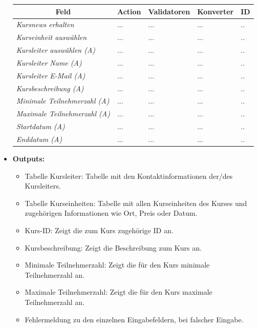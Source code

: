 \begin{itemize}
\begin{center}
\begin{longtable}{|p{3cm} |p{4cm} | p{4cm}|p{3cm} |p{2cm}|}
						\hline \multicolumn{1}{|c|}{\textbf{Feld}} & \multicolumn{1}{|c|}{\textbf{Action}} & \multicolumn{1}{|c|}{\textbf{Validatoren}}  &  \multicolumn{1}{|c|}{\textbf{Konverter}} &  \multicolumn{1}{|c|}{\textbf{ID}} \\ \hline
						\endfirsthead
						\hline
						\endlastfoot
						\textit{Kursnews erhalten} & ... & ... & ... & ..\\ \hline
						\textit{Kurseinheit auswählen} & ... & ... & ... & ..\\ \hline
						\textit{Kursleiter auswählen (A)} & ... & ... & ... & ..\\ \hline
						\textit{Kursleiter Name (A)} & ... & ... & ... & ..\\ \hline
						\textit{Kursleiter E-Mail (A)} & ... & ... & ... & ..\\ \hline
						\textit{Kursbeschreibung (A)} & ... & ... & ... & ..\\ \hline
						\textit{Minimale Teilnehmerzahl (A)} & ... & ... & ... & ..\\ \hline
						\textit{Maximale Teilnehmerzahl (A)} & ... & ... & ... & ..\\ \hline
						\textit{Startdatum (A)} & ... & ... & ... & ..\\ \hline
						\textit{Enddatum (A)} & ... & ... & ... & ..\\ \hline
					\end{longtable}
				\end{center}
			\item \textbf{Outputs:}
			\begin{itemize}
				\item Tabelle Kursleiter: Tabelle mit den Kontaktinformationen der/des Kursleiters.
				\item Tabelle Kurseinheiten: Tabelle mit allen Kurseinheiten des Kurses und zugehörigen Informationen wie Ort, Preis oder Datum.
				\item Kurs-ID: Zeigt die zum Kurs zugehörige ID an.
				\item Kursbeschreibung: Zeigt die Beschreibung zum Kurs an.
				\item Minimale Teilnehmerzahl: Zeigt die für den Kurs minimale Teilnehmerzahl an.
				\item Maximale Teilnehmerzahl: Zeigt die für den Kurs maximale Teilnehmerzahl an.
				\item Fehlermeldung zu den einzelnen Eingabefeldern, bei falscher Eingabe.
			\end{itemize}
					\begin{center}
						\begin{longtable}{|p{5cm} | p{4cm}|p{3cm}|}
							

\end{longtable}
\end{center}
\end{itemize}
